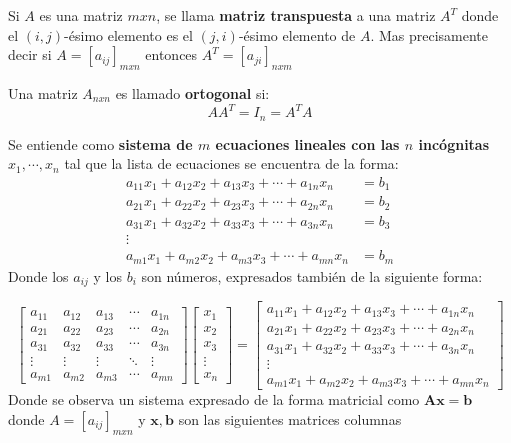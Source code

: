 \begin{defi}\citep{Blyth_2002}
    Si $A$ es una matriz $mxn$, se llama \textbf{matriz transpuesta} a una matriz $A^T$ donde el $(i,j)$-\'esimo elemento es el $(j,i)$-\'esimo elemento de $A$. Mas precisamente decir si $A={\left[a_{ij} \right]}_{mxn}$ entonces $A^T={\left[a_{ji} \right]}_{nxm}$    
\end{defi}

\begin{defi}\citep{Blyth_2002}
    Una matriz $A_{nxn}$ es llamado \textbf{ortogonal} si:
    $$AA^T=I_n=A^TA$$    
\end{defi}

\begin{defi}\citep{Blyth_2002}
    Se entiende como \textbf{sistema de $m$ ecuaciones lineales con las $n$ incógnitas} $x_1,\cdots,x_n$ tal que la lista de ecuaciones se encuentra de la forma:
    \begin{align*}
a_{11}x_1 + a_{12}x_2 + a_{13}x_3 + \cdots + a_{1n}x_n &= b_1 \\
a_{21}x_1 + a_{22}x_2 + a_{23}x_3 + \cdots + a_{2n}x_n &= b_2 \\
a_{31}x_1 + a_{32}x_2 + a_{33}x_3 + \cdots + a_{3n}x_n &= b_3 \\
\vdots \quad \quad \quad \quad \quad \quad \quad \quad \quad \quad \quad \quad \\
a_{m1}x_1 + a_{m2}x_2 + a_{m3}x_3 + \cdots + a_{mn}x_n &= b_m
\end{align*}
Donde los $a_{ij}$ y los $b_i$ son números, expresados también de la siguiente forma:

$$\begin{bmatrix}
a_{11} & a_{12} & a_{13} & \cdots & a_{1n} \\
a_{21} & a_{22} & a_{23} & \cdots & a_{2n} \\
a_{31} & a_{32} & a_{33} & \cdots & a_{3n} \\
\vdots & \vdots & \vdots & \ddots & \vdots \\
a_{m1} & a_{m2} & a_{m3} & \cdots & a_{mn}
\end{bmatrix}
\begin{bmatrix}
x_1 \\
x_2 \\
x_3 \\
\vdots \\
x_n
\end{bmatrix}
=
\begin{bmatrix}
a_{11}x_1 + a_{12}x_2 + a_{13}x_3 + \cdots + a_{1n}x_n \\
a_{21}x_1 + a_{22}x_2 + a_{23}x_3 + \cdots + a_{2n}x_n \\
a_{31}x_1 + a_{32}x_2 + a_{33}x_3 + \cdots + a_{3n}x_n \\
\vdots \\
a_{m1}x_1 + a_{m2}x_2 + a_{m3}x_3 + \cdots + a_{mn}x_n
\end{bmatrix}$$
Donde se observa un sistema expresado de la forma matricial como $\mathbf{Ax=b}$ donde $A={\left[a_{ij} \right]}_{mxn}$ y $\mathbf{x,b}$ son las siguientes matrices columnas


\end{defi}
